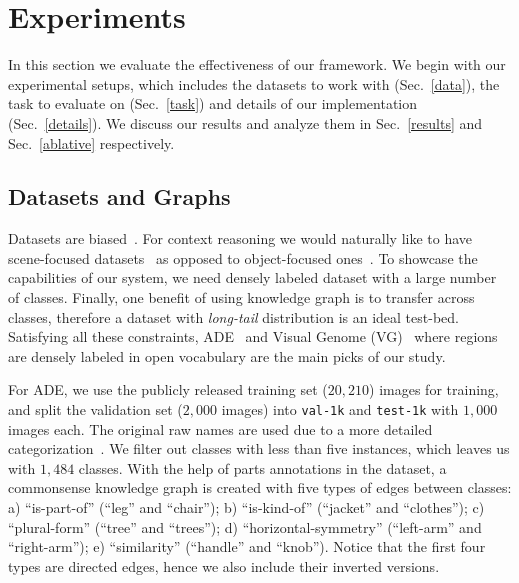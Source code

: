 \documentclass[10pt,twocolumn,letterpaper]{article}
\begin{document}
\vspace{-0.05in}
\section{Experiments}
\vspace{-0.05in}
In this section we evaluate the effectiveness of our framework. We begin with our experimental setups, which includes the datasets to work with (Sec.~\ref{data}), the task to evaluate on (Sec.~\ref{task}) and details of our implementation (Sec.~\ref{details}). We discuss our results and analyze them in Sec.~\ref{results} and Sec.~\ref{ablative} respectively. 

\subsection{Datasets and Graphs\label{data}}
Datasets are biased~\cite{torralba2011unbiased}. For context reasoning we would naturally like to have scene-focused datasets~\cite{zhou2016semantic} as opposed to object-focused ones~\cite{russakovsky2015imagenet}. To showcase the capabilities of our system, we need densely labeled dataset with a large number of classes. Finally, one benefit of using knowledge graph is to transfer across classes, therefore a dataset with \emph{long-tail} distribution is an ideal test-bed. Satisfying all these constraints, ADE~\cite{zhou2016semantic} and Visual Genome (VG)~\cite{krishna2016visual} where regions are densely labeled in open vocabulary are the main picks of our study. 

For ADE, we use the publicly released training set ($20,210$) images for training, and split the validation set ($2,000$ images) into {\tt val-1k} and {\tt test-1k} with $1,000$ images each. The original raw names are used due to a more detailed categorization~\cite{zhou2016semantic}. We filter out classes with less than five instances, which leaves us with $1,484$ classes. With the help of parts annotations in the dataset, a commonsense knowledge graph is created with five types of edges between classes: a) ``is-part-of'' (\eg ``leg'' and ``chair''); b) ``is-kind-of'' (\eg ``jacket'' and ``clothes''); c) ``plural-form'' (\eg ``tree'' and ``trees''); d) ``horizontal-symmetry'' (\eg ``left-arm'' and ``right-arm''); e) ``similarity'' (\eg ``handle'' and ``knob''). Notice that the first four types are directed edges, hence we also include their inverted versions. 
\end{document}
